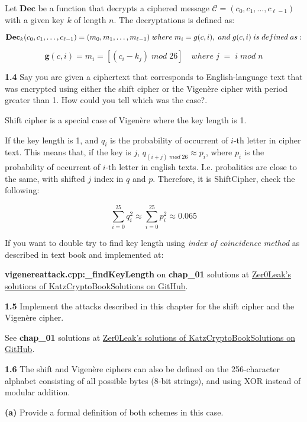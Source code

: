 Let \(\textbf{Dec}\) be a function that decrypts a ciphered message \( \mathcal{C} = (c_0, c_1, \dots, c_{\ell-1}) \) with a given key \( k \) of length \(n\). The decryptations is defined as:

\[
\textbf{Dec\( _k\)}(c_0, c_1, \dots, c_{\ell-1}) = (m_0, m_1, \dots, m_{\ell-1}) \; where \; m_i = g(c, i),\; and \; g(c, i) \;is\;defined\;as:
\]

\[
\textbf{g}(c, i) = m_i = [(c_i - k_j) \; mod \;26] \quad where \; j \; = \; i \; mod \; n
\]

\vspace{1em}
\noindent
\textbf{1.4} \hspace{1em} Say you are given a ciphertext that corresponds to English-language text that was encrypted using either the shift cipher or the Vigenère cipher with period greater than 1. How could you tell which was the case?.
\vspace{1em}

Shift cipher is a special case of Vigenère where the key length is 1.

If the key length is 1, and \( q_i \) is the probability of occurrent of $i$-th letter in cipher text. This means that, if the key is \( j \),  \( q_{(i + j)\;mod\;26} \approx  p_i \), where \(p_i\) is the probability of occurrent of $i$-th letter in english texts. I.e. probalities are close to the same, with shifted \(j\) index in \(q\) and \(p\). Therefore, it is ShiftCipher, check the following:

\[
\sum_{i=0}^{25} q_i^2 \approx \sum_{i=0}^{25} p_i^2 \approx 0.065
\]

If you want to double try to find key length using \textit{index of coincidence method} as described in text book and implemented at:

\textbf{vigenereattack.cpp:\_findKeyLength} on \textbf{chap\_01} solutions at \href{https://github.com/Zer0Leak/KatzCryptoBookSolutions}{Zer0Leak's solutions of KatzCryptoBookSolutions on GitHub}.

\vspace{1em}
\noindent
\textbf{1.5} \hspace{1em} Implement the attacks described in this chapter for the shift cipher and
the Vigenère cipher.
\vspace{1em}

See \textbf{chap\_01} solutions at \href{https://github.com/Zer0Leak/KatzCryptoBookSolutions}{Zer0Leak's solutions of KatzCryptoBookSolutions on GitHub}.

\vspace{1em}
\noindent
\textbf{1.6} \hspace{1em} The shift and Vigenère ciphers can also be defined on the 256-character
alphabet consisting of all possible bytes (8-bit strings), and using XOR
instead of modular addition.\\[0.5em]
\hspace*{0.0em}\parbox[t]{\dimexpr\linewidth-3.0em}{
	\textbf{(a)} Provide a formal definition of both schemes in this case.
}\\[0.5em]


